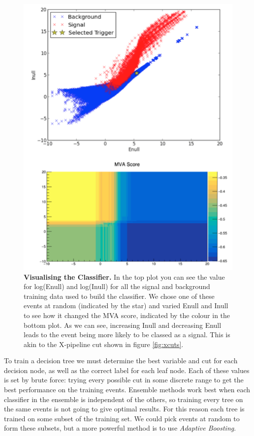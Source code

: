\documentclass[11pt]{cuthesis}
\newcommand{\xp}{X-pipeline }
\begin{document}
\begin{figure} %
\begin{center}
\includegraphics[width=0.8\linewidth]{mva_trigger_and_score2.png}
\end{center}
\caption{\textbf{Visualising the Classifier.} In the top plot you can see the value for log(Enull) and log(Inull) for all the signal and background training data used to build the classifier. We chose one of these events at random (indicated by the star) and varied Enull and Inull to see how it changed the MVA score, indicated by the colour in the bottom plot. As we can see, increasing Inull and decreasing Enull leads to the event being more likely to be classed as a signal. This is akin to the \xp cut shown in figure \ref{fig:xcuts}. }
\label{fig:mvacuts}
\end{figure}

To train a decision tree we must determine the best variable and cut for each decision node, as well as the correct label for each leaf node. Each of these values is set by brute force: trying every possible cut in some discrete range to get the best performance on the training events. Ensemble methods work best when each classifier in the ensemble is independent of the others, so training every tree on the same events is not going to give optimal results. For this reason each tree is trained on some subset of the training set. We could pick events at random to form these subsets, but a more powerful method is to use \textit{Adaptive Boosting}. 
\end{document}
